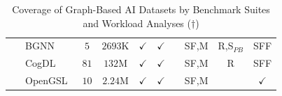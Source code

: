 \begin{landscape}
\begin{table}[htbp]
\begin{tabular}{ll|cccccccc}
               {\footnotesize ~              }  & {\footnotesize BGNN~\cite{Dwivedi2023}                 }      &  $5$      &  $2693$K     & $\checkmark$  & $\checkmark$  &               & SF,M          & R,S$_{PB}$    & SFF           \\
               {\footnotesize ~              }  & {\footnotesize CogDL~\cite{Cen2023}                    }      &  $81$     &  $132$M      & $\checkmark$  & $\checkmark$  &               & SF,M          & R             & SFF           \\
               {\footnotesize ~              }  & {\footnotesize OpenGSL~\cite{Zhou2024}               }        &  $10$     &  $2.24$M     & $\checkmark$  & $\checkmark$  &               & SF,M          &               & $\checkmark$  \\
        \end{tabular}
        \caption{Coverage of Graph-Based AI Datasets by Benchmark Suites and Workload Analyses ($\dagger$)}
        \label{table:benchmark-datasets}
    \end{table}
\end{landscape}



